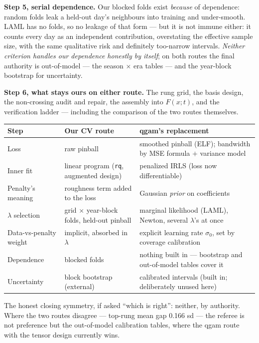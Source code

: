 \documentclass[11pt]{article}
\newcommand{\code}[1]{\texttt{#1}}
\begin{document}
\textbf{Step 5, serial dependence.} Our blocked folds exist \emph{because}
of dependence: random folds leak a held-out day's neighbours into training
and under-smooth. LAML has no folds, so no leakage of that form --- but it
is not immune either: it counts every day as an independent contribution,
overstating the effective sample size, with the same qualitative risk and
definitely too-narrow intervals. \emph{Neither criterion handles our
dependence honestly by itself}; on both routes the final authority is
out-of-model --- the season $\times$ era tables --- and the year-block
bootstrap for uncertainty.

\textbf{Step 6, what stays ours on either route.} The rung grid, the basis
design, the non-crossing audit and repair, the assembly into $F(x;t)$, and
the verification ladder --- including the comparison of the two routes
themselves.

\begin{center}
\small
\begin{tabular}{@{}p{3.4cm}p{5.3cm}p{5.6cm}@{}}
\toprule
\textbf{Step} & \textbf{Our CV route} & \textbf{qgam's replacement} \\
\midrule
Loss & raw pinball & smoothed pinball (ELF); bandwidth by MSE formula
$+$ variance model \\
Inner fit & linear program (\code{rq}, augmented design) & penalized IRLS
(loss now differentiable) \\
Penalty's meaning & roughness term added to the loss & Gaussian
\emph{prior} on coefficients \\
$\lambda$ selection & grid $\times$ year-block folds, held-out pinball &
marginal likelihood (LAML), Newton, several $\lambda$'s at once \\
Data-vs-penalty weight & implicit, absorbed in $\lambda$ & explicit
learning rate $\sigma_0$, set by coverage calibration \\
Dependence & blocked folds & nothing built in --- bootstrap and
out-of-model tables cover it \\
Uncertainty & block bootstrap (external) & calibrated intervals (built in;
deliberately unused here) \\
\bottomrule
\end{tabular}
\end{center}

The honest closing symmetry, if asked ``which is right'': neither, by
authority. Where the two routes disagree --- top-rung mean gap 0.166 sd ---
the referee is not preference but the out-of-model calibration tables,
where the qgam route with the tensor design currently wins.
\end{document}

